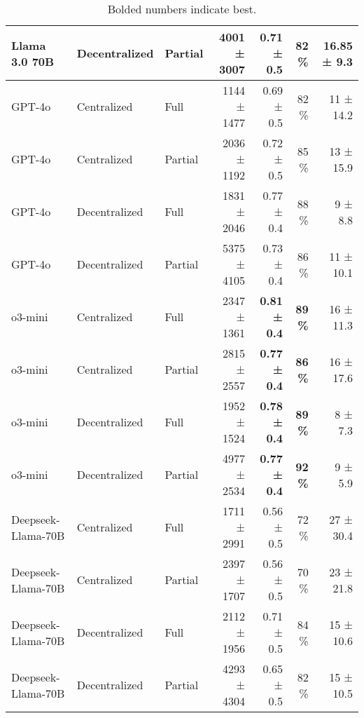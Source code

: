 \begin{table*}[h]
\begin{tabular}{lllrrrr}
        Llama 3.0 70B      & Decentralized & Partial       & 4001 ± 3007 & 0.71 ± 0.5          & 82 \%              & 16.85 ± 9.3       \\
        \midrule
        GPT-4o             & Centralized   & Full          & 1144 ± 1477 & 0.69 ± 0.5          & 82 \%              & 11 ± 14.2         \\
        GPT-4o             & Centralized   & Partial       & 2036 ± 1192 & 0.72 ± 0.5          & 85 \%              & 13 ± 15.9         \\
        GPT-4o             & Decentralized & Full          & 1831 ± 2046 & 0.77 ± 0.4          & 88 \%              & 9 ± 8.8           \\
        GPT-4o             & Decentralized & Partial       & 5375 ± 4105 & 0.73 ± 0.4          & 86 \%              & 11 ± 10.1         \\
        \midrule
        o3-mini            & Centralized   & Full          & 2347 ± 1361 & \textbf{0.81 ± 0.4} & \textbf{89 \%}     & 16 ± 11.3         \\
        o3-mini            & Centralized   & Partial       & 2815 ± 2557 & \textbf{0.77 ± 0.4} & \textbf{86 \%}     & 16 ± 17.6         \\
        o3-mini            & Decentralized & Full          & 1952 ± 1524 & \textbf{0.78 ± 0.4} & \textbf{89 \%}     & 8 ± 7.3           \\
        o3-mini            & Decentralized & Partial       & 4977 ± 2534 & \textbf{0.77 ± 0.4} & \textbf{92 \%}     & 9 ± 5.9           \\
        \midrule
        Deepseek-Llama-70B & Centralized   & Full          & 1711 ± 2991 & 0.56 ± 0.5          & 72 \%              & 27 ± 30.4         \\
        Deepseek-Llama-70B & Centralized   & Partial       & 2397 ± 1707 & 0.56 ± 0.5          & 70 \%              & 23 ± 21.8         \\
        Deepseek-Llama-70B & Decentralized & Full          & 2112 ± 1956 & 0.71 ± 0.5          & 84 \%              & 15 ± 10.6         \\
        Deepseek-Llama-70B & Decentralized & Partial       & 4293 ± 4304 & 0.65 ± 0.5          & 82 \%              & 15 ± 10.5         \\
        \bottomrule
    \end{tabular}
    \caption{Bolded numbers indicate best.}
    \label{tab:results}
\end{table*}

